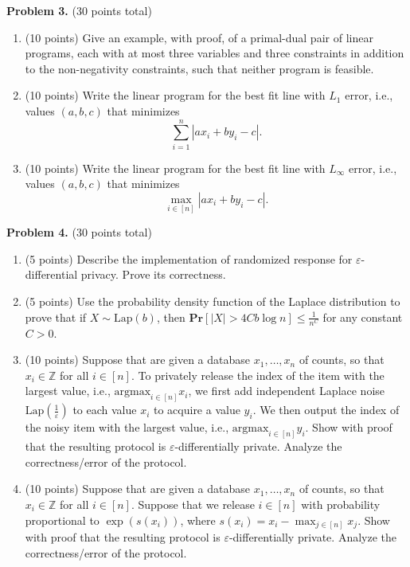 \documentclass[11pt]{article}
\newcommand{\PPr}[1]{\ensuremath{\mathbf{Pr}\left[#1\right]}}
\newcommand{\eps}{\varepsilon}
\begin{document}
\vskip 0.2in\noindent
\textbf{Problem 3.} (30 points total)
\begin{enumerate}
\item (10 points)
Give an example, with proof, of a primal-dual pair of linear programs, each with at most three variables and three constraints in addition to the non-negativity constraints, such that neither program is feasible. 
\item (10 points)
Write the linear program for the best fit line with $L_1$ error, i.e., values $(a,b,c)$ that minimizes 
\[\sum_{i=1}^n|ax_i+by_i-c|.\]
\item (10 points)
Write the linear program for the best fit line with $L_\infty$ error, i.e., values $(a,b,c)$ that minimizes 
\[\max_{i\in[n]}|ax_i+by_i-c|.\] 
\end{enumerate}

\vskip 0.2in\noindent
\textbf{Problem 4.} (30 points total)
\begin{enumerate}
\item (5 points)
Describe the implementation of randomized response for $\eps$-differential privacy. 
Prove its correctness.
\item (5 points)
Use the probability density function of the Laplace distribution to prove that if $X\sim\text{Lap}(b)$, then $\PPr{|X|>4Cb\log n}\le\frac{1}{n^C}$ for any constant $C>0$.  
\item (10 points)
Suppose that are given a database $x_1,\ldots,x_n$ of counts, so that $x_i\in\mathbb{Z}$ for all $i\in[n]$. 
To privately release the index of the item with the largest value, i.e., $\text{argmax}_{i\in[n]} x_i$, we first add independent Laplace noise $\text{Lap}\left(\frac{1}{\eps}\right)$ to each value $x_i$ to acquire a value $y_i$. 
We then output the index of the noisy item with the largest value, i.e., $\text{argmax}_{i\in[n]} y_i$. 
Show with proof that the resulting protocol is $\eps$-differentially private. 
Analyze the correctness/error of the protocol. 
\item (10 points)
Suppose that are given a database $x_1,\ldots,x_n$ of counts, so that $x_i\in\mathbb{Z}$ for all $i\in[n]$. 
Suppose that we release $i\in[n]$ with probability proportional to $\exp(s(x_i))$, where $s(x_i)=x_i-\max_{j\in[n]} x_j$. 
Show with proof that the resulting protocol is $\eps$-differentially private. 
Analyze the correctness/error of the protocol. 
\end{enumerate}
\end{document}
